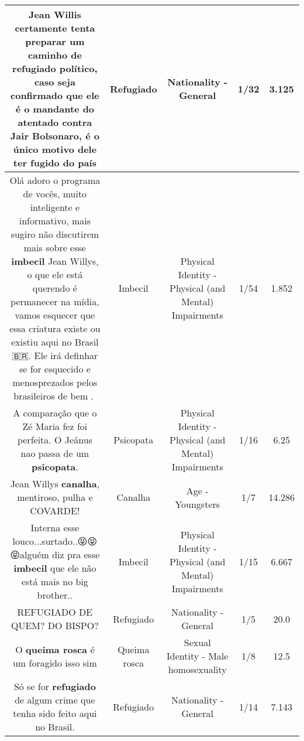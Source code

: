 \documentclass[11pt]{article}
\newlength\mylength
\begin{document}
\begin{center}
\begin{longtable}{|C{.65\mylength}|C{.30\mylength}|C{.12\mylength}|C{.12\mylength}|C{.12\mylength}|}
  \small Jean Willis certamente tenta preparar um caminho de \textbf{refugiado} político, caso seja confirmado que ele é o mandante do atentado contra Jair Bolsonaro, é o único motivo dele ter fugido do país\normalsize   & Refugiado & Nationality - General & 1/32 & 3.125 \\  \hline
  \small Olá adoro o programa de vocês, muito inteligente e informativo, mais sugiro não discutirem mais sobre esse \textbf{imbecil} Jean Willys, o que ele está querendo é permanecer na mídia, vamos esquecer que essa criatura existe ou existiu aqui no Brasil 🇧🇷. Ele irá definhar se for esquecido e menosprezados pelos brasileiros de bem .🤮\normalsize   & Imbecil & Physical Identity - Physical (and Mental) Impairments & 1/54 & 1.852 \\  \hline
  \small A comparação que o Zé Maria fez foi perfeita.  O Jeânus nao passa de um \textbf{psicopata}.\normalsize   & Psicopata & Physical Identity - Physical (and Mental) Impairments & 1/16 & 6.25 \\  \hline
  \small Jean Willys \textbf{canalha}, mentiroso, pulha e COVARDE!\normalsize   & Canalha & Age - Youngsters & 1/7 & 14.286 \\  \hline
  \small Interna esse louco...surtado..😝😝😝alguém diz pra esse \textbf{imbecil} que ele não está mais no big brother..\normalsize   & Imbecil & Physical Identity - Physical (and Mental) Impairments & 1/15 & 6.667 \\  \hline
  \small REFUGIADO DE QUEM? DO BISPO?\normalsize   & Refugiado & Nationality - General & 1/5 & 20.0 \\  \hline
  \small O \textbf{queima rosca} é um foragido isso sim\normalsize   & Queima rosca & Sexual Identity - Male homosexuality & 1/8 & 12.5 \\  \hline
  \small Só se for \textbf{refugiado} de algum crime que tenha sido feito aqui no Brasil.\normalsize   & Refugiado & Nationality - General & 1/14 & 7.143 \\  \hline

\end{longtable}
\end{center}
\end{document}
